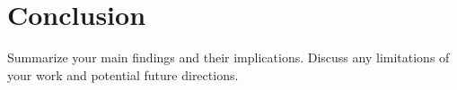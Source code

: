 \section{Conclusion}
Summarize your main findings and their implications. Discuss any limitations of your work and potential future directions.